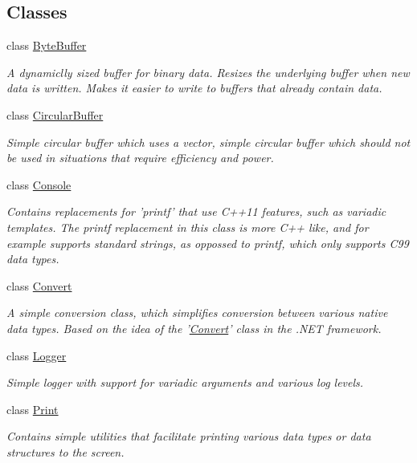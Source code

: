 \subsection*{Classes}
\begin{DoxyCompactItemize}
\item 
class \hyperlink{class_senergy_1_1_byte_buffer}{Byte\-Buffer}
\begin{DoxyCompactList}\small\item\em A dynamiclly sized buffer for binary data. Resizes the underlying buffer when new data is written. Makes it easier to write to buffers that already contain data. \end{DoxyCompactList}\item 
class \hyperlink{class_senergy_1_1_circular_buffer}{Circular\-Buffer}
\begin{DoxyCompactList}\small\item\em Simple circular buffer which uses a vector, simple circular buffer which should not be used in situations that require efficiency and power. \end{DoxyCompactList}\item 
class \hyperlink{class_senergy_1_1_console}{Console}
\begin{DoxyCompactList}\small\item\em Contains replacements for 'printf' that use C++11 features, such as variadic templates. The printf replacement in this class is more C++ like, and for example supports standard strings, as oppossed to printf, which only supports C99 data types. \end{DoxyCompactList}\item 
class \hyperlink{class_senergy_1_1_convert}{Convert}
\begin{DoxyCompactList}\small\item\em A simple conversion class, which simplifies conversion between various native data types. Based on the idea of the '\hyperlink{class_senergy_1_1_convert}{Convert}' class in the .N\-E\-T framework. \end{DoxyCompactList}\item 
class \hyperlink{class_senergy_1_1_logger}{Logger}
\begin{DoxyCompactList}\small\item\em Simple logger with support for variadic arguments and various log levels. \end{DoxyCompactList}\item 
class \hyperlink{class_senergy_1_1_print}{Print}
\begin{DoxyCompactList}\small\item\em Contains simple utilities that facilitate printing various data types or data structures to the screen. \end{DoxyCompactList}\item 

\end{DoxyCompactItemize}

